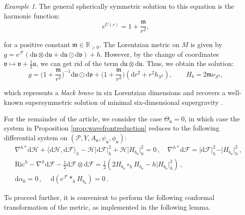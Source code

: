 \documentclass[10pt,a4paper,twoside,reqno]{amsart}
\theoremstyle{plain}
\theoremstyle{definition}
\theoremstyle{remark}
\newtheorem{example}[thm]{Example}
\def\dd{\mathrm{d}}
\def\cH{\mathcal{H}}
\def\cP{\mathcal{P}}
\def\cP{\mathcal{P}}
\def\cF{\mathcal{F}}
\def\cH{\mathcal{H}}
\def\dd{\mathrm{d}}
\def\fru{\mathfrak{u}}
\def\frv{\mathfrak{v}}
\begin{document}
\begin{example}
\noindent
The general spherically symmetric solution to this equation is the harmonic function:
\begin{equation*}
e^{U(r)} = 1 + \frac{\mathfrak{m}}{r^2},
\end{equation*}

\noindent
for a positive constant $\mathfrak{m}\in\mathbb{R}_{>0}$. The Lorentzian metric on $M$ is given by $g = e^{\cF}(\dd\fru\otimes \dd\fru +  \dd \fru\odot \dd \frv) + h$. However, by the change of coordinates $\frv\mapsto\frv+\frac{1}{2}\fru$, we can get rid of the term $\dd\fru\otimes\dd\fru$. Thus, we obtain the solution:
\begin{equation*}
g = \Big(1+\frac{\mathfrak{m}}{r^2}\Big)^{-1} \dd \fru\odot \dd \frv + \Big(1+\frac{\mathfrak{m}}{r^2}\Big)(\dd r^2 + r^2 h_{S^3}),\qquad  H_b = 2\mathfrak{m}\nu_{S^3},
\end{equation*}

\noindent
which represents a \emph{black brane} in six Lorentzian dimensions and recovers a well-known supersymmetric solution of minimal six-dimensional supergravity \cite{Duff_Lu_1994}.
\end{example}

For the remainder of the article, we consider the case $\Theta_{\fru} = 0$, in which case the system in Proposition \ref{prop:wavefrontreduction} reduces to the following differential system on $(\cP,Y,A_{\fru} , \psi_{\fru} , \phi_{\fru})$:
\begin{eqnarray}
& \nabla^{h\ast} \dd\cH + \langle \dd\cH, \dd\cF \rangle_h -   \cH \vert \dd\cF \vert^2_h  +   \cH \vert H_{b_{\fru}} \vert^2_h = 0\, , \quad  \nabla^{h\ast}\dd \cF   = \vert \dd\cF \vert^2_h -   \vert H_{b_{\fru}} \vert^2_h\, ,\label{eq:wavefront01}\\
& \mathrm{Ric}^h - \nabla^h \dd \cF - \frac{1}{2} \dd \cF \otimes \dd \cF = \frac{1}{2} (2H_{b_{\fru}}\circ_h H_{b_{\fru}} - h \vert H_{b_{\fru}} \vert^2_h )\, ,\label{eq:wavefront02}\\
& \dd\alpha_{0} = 0\, ,\  \quad \dd (e^{\cF} \ast_h H_{b_{\fru}}) = 0\, .\label{eq:wavefront03}
\end{eqnarray}

To proceed further, it is convenient to perform the following conformal transformation of the metric, as implemented in the following lemma.
\end{document}
